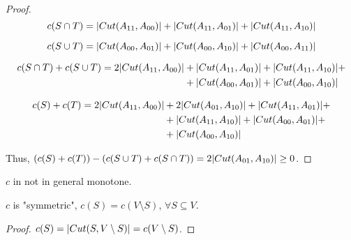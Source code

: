 \begin{proof}
        \begin{equation*}
                c(S \cap T) = \vert Cut(A_{11}, A_{00}) \vert + \vert Cut(A_{11}, A_{01}) \vert + \vert Cut(A_{11}, A_{10}) \vert
        \end{equation*}

        \begin{equation*}
                c(S \cup T) = \vert Cut(A_{00}, A_{01}) \vert + \vert Cut(A_{00}, A_{10}) \vert + \vert Cut(A_{00}, A_{11}) \vert
        \end{equation*}

        \begin{equation*}
            \begin{split}                
                c(S \cap T) + c(S \cup T) = 2 \vert Cut(A_{11}, A_{00}) \vert &+ \vert Cut(A_{11}, A_{01}) \vert + \vert Cut(A_{11}, A_{10}) \vert +\\
                &+ \vert Cut(A_{00}, A_{01}) \vert + \vert Cut(A_{00}, A_{10}) \vert
            \end{split}
        \end{equation*}

        \begin{equation*}
            \begin{split}                
                c(S) + c(T) = 2 \vert Cut(A_{11}, A_{00}) \vert &+ 2 \vert Cut(A_{01}, A_{10}) \vert + \vert Cut(A_{11}, A_{01}) \vert +\\
                &+ \vert Cut(A_{11}, A_{10}) \vert + \vert Cut(A_{00}, A_{01}) \vert +\\
                &+ \vert Cut(A_{00}, A_{10}) \vert
            \end{split}
        \end{equation*}

        Thus, $(c(S) + c(T)) - (c(S \cup T) + c(S \cap T)) = 2 \vert Cut(A_{01}, A_{10}) \vert \geq 0$.
    \end{proof}

    \begin{observation}
        $c$ in not in general monotone.
    \end{observation}

    \begin{observation}
        $c$ is "symmetric", $c(S) = c(V \setminus S)$, $\forall S \subseteq V$.
    \end{observation}

    \begin{proof}
        $c(S) = \vert Cut(S, V \setminus S) \vert = c(V \setminus S)$.
    \end{proof}

